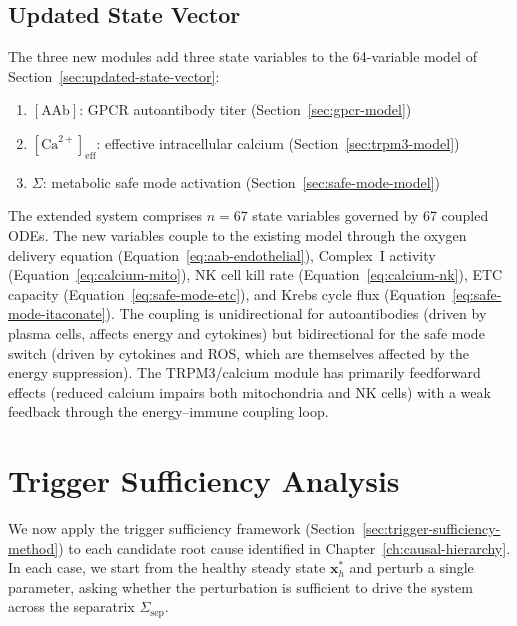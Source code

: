 \subsection{Updated State Vector}
\label{sec:extended-state-vector}

The three new modules add three state variables to the 64-variable model of Section~\ref{sec:updated-state-vector}:

\begin{enumerate}
    \item $[\text{AAb}]$: GPCR autoantibody titer (Section~\ref{sec:gpcr-model})
    \item $[\text{Ca}^{2+}]_{\text{eff}}$: effective intracellular calcium (Section~\ref{sec:trpm3-model})
    \item $\Sigma$: metabolic safe mode activation (Section~\ref{sec:safe-mode-model})
\end{enumerate}

The extended system comprises $n = 67$ state variables governed by 67 coupled ODEs. The new variables couple to the existing model through the oxygen delivery equation (Equation~\ref{eq:aab-endothelial}), Complex~I activity (Equation~\ref{eq:calcium-mito}), NK cell kill rate (Equation~\ref{eq:calcium-nk}), ETC capacity (Equation~\ref{eq:safe-mode-etc}), and Krebs cycle flux (Equation~\ref{eq:safe-mode-itaconate}). The coupling is unidirectional for autoantibodies (driven by plasma cells, affects energy and cytokines) but bidirectional for the safe mode switch (driven by cytokines and ROS, which are themselves affected by the energy suppression). The TRPM3/calcium module has primarily feedforward effects (reduced calcium impairs both mitochondria and NK cells) with a weak feedback through the energy--immune coupling loop.

\section{Trigger Sufficiency Analysis}
\label{sec:trigger-sufficiency}

We now apply the trigger sufficiency framework (Section~\ref{sec:trigger-sufficiency-method}) to each candidate root cause identified in Chapter~\ref{ch:causal-hierarchy}. In each case, we start from the healthy steady state $\mathbf{x}_h^*$ and perturb a single parameter, asking whether the perturbation is sufficient to drive the system across the separatrix $\Sigma_{\mathrm{sep}}$.

